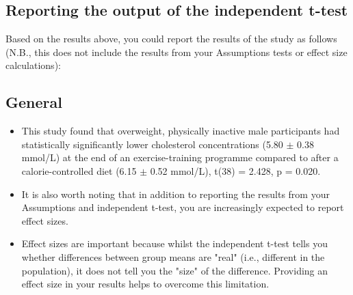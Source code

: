 \documentclass[]{article}
\begin{document}
\subsection{Reporting the output of the independent t-test}
	Based on the results above, you could report the results of the study as follows (N.B., this does not include the results from your Assumptions tests or effect size calculations):
	
\subsection{General}
\begin{itemize}
	\item 	This study found that overweight, physically inactive male participants had statistically significantly lower cholesterol concentrations (5.80 $\pm$ 0.38 mmol/L) at the end of an exercise-training programme compared to after a calorie-controlled diet (6.15 $\pm$ 0.52 mmol/L), t(38) = 2.428, p = 0.020.
	
\item It is also worth noting that in addition to reporting the results from your Assumptions and independent t-test, you are increasingly expected to report effect sizes.
\item Effect sizes are important because whilst the independent t-test tells you whether differences between group means are "real" (i.e., different in the population), it does not tell you the "size" of the difference. Providing an effect size in your results helps to overcome this limitation. 
\end{itemize}

	
\end{document}
